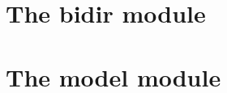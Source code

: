 \documentclass[12pt,letterpaper]{article}
\begin{document}
\section{The bidir module}

\section{The model module}
\end{document}
